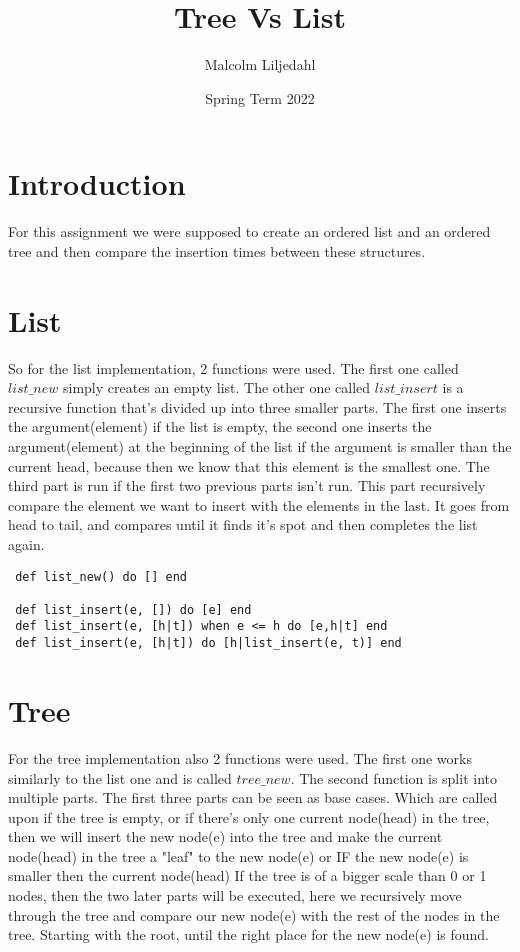 \documentclass[a4paper,11pt]{article}
\begin{document}
\title{
    \textbf{Tree Vs List}
}
\author{Malcolm Liljedahl}
\date{Spring Term 2022}

\maketitle

\section*{Introduction}

For this assignment we were supposed to create an ordered list and an ordered tree and then compare the insertion times between these structures.

\section{List}

So for the list implementation, 2 functions were used. The first one called $list\_new$ simply creates an empty list. The other one called $list\_insert$ is a recursive function that's divided up into three smaller parts. The first one inserts the argument(element) if the list is empty, the second one inserts the argument(element) at the beginning of the list if the argument is smaller than the current head, because then we know that this element is the smallest one. The third part is run if the first two previous parts isn't run. This part recursively compare the element we want to insert with the elements in the last. It goes from head to tail, and compares until it finds it's spot and then completes the list again.

\begin{verbatim}
 def list_new() do [] end

 def list_insert(e, []) do [e] end
 def list_insert(e, [h|t]) when e <= h do [e,h|t] end
 def list_insert(e, [h|t]) do [h|list_insert(e, t)] end
\end{verbatim}


\section{Tree}

For the tree implementation also 2 functions were used. The first one works similarly to the list one and is called $tree\_new$. The second function is split into multiple parts. The first three parts can be seen as base cases. Which are called upon if the tree is empty, or if there's only one current node(head) in the tree, then we will insert the new node(e) into the tree and make the current node(head) in the tree a "leaf" to the new node(e) or IF the new node(e) is smaller then the current node(head)
If the tree is of a bigger scale than 0 or 1 nodes, then the two later parts will be executed, here we recursively move through the tree and compare our new node(e) with the rest of the nodes in the tree. Starting with the root, until the right place for the new node(e) is found.
\end{document}
